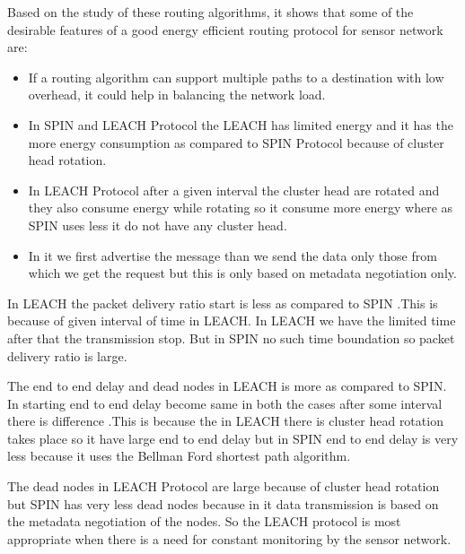 \documentclass[journal,transmag]{IEEEtran}
\begin{document}
Based on the study of these routing algorithms, it shows that some of the desirable features of a good energy efficient routing protocol for sensor network are:
\begin{itemize}
  \item If a routing algorithm can support multiple paths to a destination with low overhead, it could help in balancing the network load.
  \item In SPIN and LEACH Protocol the LEACH has limited energy and it has the more energy consumption as  compared to SPIN Protocol because of cluster head rotation.
  \item In LEACH Protocol after a given interval the cluster head are rotated and they also consume energy while rotating so it consume more energy where as SPIN uses less it do not have  any cluster head.
  \item In it we first advertise the message than we send the data only those from which we get the request but this is only based on metadata negotiation only.
\end{itemize}

In LEACH the packet delivery ratio start is less as compared to SPIN .This is because of given interval of time in LEACH. In LEACH we have the limited time after that the transmission stop. But in SPIN no such time boundation so packet delivery ratio is large.

The end to end delay and dead nodes in LEACH is more as compared to SPIN. In starting end to end delay become same in both the cases after some interval there is difference .This is because the in LEACH there is cluster head rotation takes place so it have large end to end delay but in SPIN end to end delay is very less because it uses the Bellman Ford shortest path algorithm.

The dead nodes in LEACH Protocol are large because of cluster head rotation but SPIN has very less dead nodes because in it data transmission is based on the metadata negotiation of the nodes. So the LEACH protocol is most appropriate when there is a need for constant monitoring by the sensor network.
\end{document}
